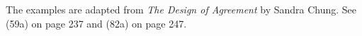 \noindent The examples are adapted from {\it The Design of
Agreement\/} by Sandra Chung.  See (59a) on page 237 and (82a) on
page 247.




%
%
\endinput
Executing |\glbrackets| creates commands |\[| and |\]|
which insert the appropriate brackets and space.  The macro that
assembles word-gloss pairs is sensitive to words beginning with
